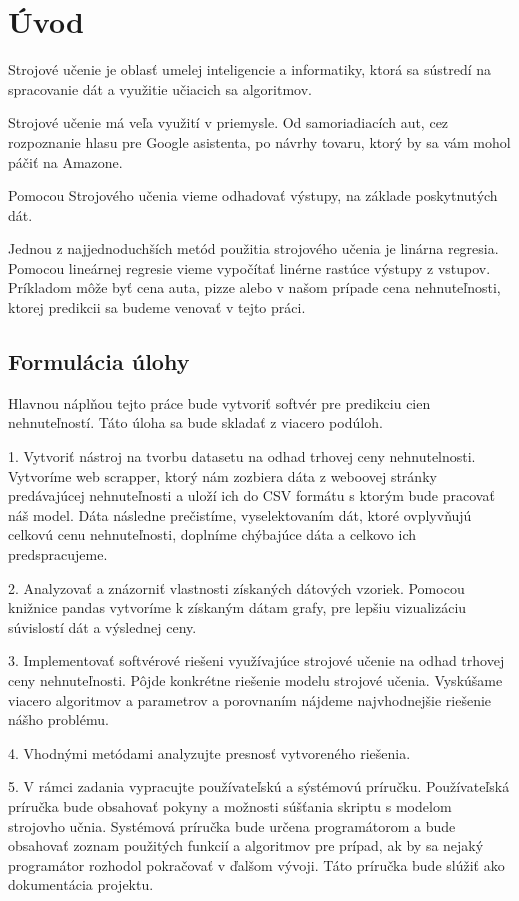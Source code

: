 
{}

\chapter*{Úvod}
Strojové učenie je oblasť umelej inteligencie a informatiky, ktorá sa sústredí na spracovanie dát a využitie učiacich sa algoritmov.

Strojové učenie má veľa využití v priemysle. Od samoriadiacích aut, cez rozpoznanie hlasu pre Google asistenta, po návrhy tovaru, ktorý by sa vám mohol páčiť na Amazone.

Pomocou Strojového učenia vieme odhadovať výstupy, na základe poskytnutých dát. 

Jednou z najjednoduchších metód použitia strojového učenia je linárna regresia. Pomocou lineárnej regresie vieme vypočítať linérne rastúce výstupy z vstupov. Príkladom môže byť cena auta, pizze alebo v našom prípade cena nehnuteľnosti, ktorej predikcii sa budeme venovať v tejto práci.


\section*{Formulácia úlohy}
Hlavnou náplňou tejto práce bude vytvoriť softvér pre predikciu cien nehnuteľností. Táto úloha sa bude skladať z viacero podúloh.

1. Vytvoriť nástroj na tvorbu datasetu na odhad trhovej ceny nehnutelnosti. Vytvoríme web scrapper, ktorý nám zozbiera dáta z weboovej stránky predávajúcej nehnuteľnosti a uloží ich do CSV formátu s ktorým bude pracovať náš model. Dáta následne prečistíme, vyselektovaním dát, ktoré ovplyvňujú celkovú cenu nehnuteľnosti, doplníme chýbajúce dáta a celkovo ich predspracujeme.

2. Analyzovať a znázorniť vlastnosti získaných dátových vzoriek. Pomocou knižnice pandas vytvoríme k získaným dátam grafy, pre lepšiu vizualizáciu súvislostí dát a výslednej ceny.

3. Implementovať softvérové riešeni využívajúce strojové učenie na odhad trhovej ceny nehnuteľnosti. Pôjde konkrétne riešenie modelu strojové učenia. Vyskúšame viacero algoritmov a parametrov a porovnaním nájdeme najvhodnejšie riešenie nášho problému.

4. Vhodnými metódami analyzujte presnosť vytvoreného riešenia. 

5. V rámci zadania vypracujte používateľskú a sýstémovú príručku. Používateľská príručka bude obsahovať pokyny a možnosti súšťania skriptu s modelom strojovho učnia. Systémová príručka bude určena programátorom a bude obsahovať zoznam použitých funkcií a algoritmov pre prípad, ak by sa nejaký programátor rozhodol pokračovať v ďalšom vývoji. Táto príručka bude slúžiť ako dokumentácia projektu. 